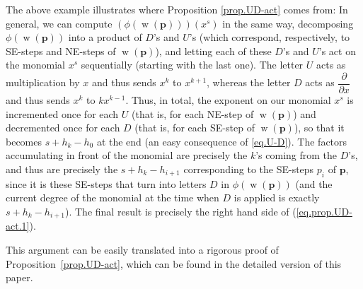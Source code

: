 \documentclass[numbers=enddot,12pt,final,onecolumn,notitlepage]{scrartcl}%
\theoremstyle{definition}
\newcommand{\pp}{\mathbf{p}}
\newcommand{\w}{\operatorname{w}}
\newcommand{\tup}[1]{\left( #1 \right)}
\newenvironment{vershort}{}{}
\begin{document}
The above example illustrates where Proposition \ref{prop.UD-act} comes from:
In general, we can compute $\left(  \phi\left(  \w\left(
\pp\right)  \right)  \right)  \left(  x^{s}\right)  $ in the same way,
decomposing $\phi\left(  \w\left(  \pp\right)  \right)
$ into a product of $D$'s and $U$'s (which correspond, respectively, to
SE-steps and NE-steps of $\w\left(  \pp\right)  $), and
letting each of these $D$'s and $U$'s act on the monomial $x^{s}$ sequentially
(starting with the last one). The letter $U$ acts as multiplication by $x$ and
thus sends $x^{k}$ to $x^{k+1}$, whereas the letter $D$ acts as $\dfrac
{\partial}{\partial x}$ and thus sends $x^{k}$ to $kx^{k-1}$. Thus, in total,
the exponent on our monomial $x^{s}$ is incremented once for each $U$ (that
is, for each NE-step of $\w\left(  \pp\right)  $) and
decremented once for each $D$ (that is, for each SE-step of $\w\left(  \pp\right)  $), so that it
becomes $s+h_{k}-h_{0}$ at the end (an easy consequence of \eqref{eq.U-D}).
The factors accumulating in front of the monomial are precisely the $k$'s
coming from the $D$'s, and thus are precisely the $s+h_{k}-h_{i+1}$
corresponding to the SE-steps $p_{i}$ of $\pp$, since it is these
SE-steps that turn into letters $D$ in $\phi\left(  \w\tup{\pp}\right)  $ (and the
current degree of the monomial at the time when $D$ is applied is exactly
$s+h_{k}-h_{i+1}$). The final result is precisely the right hand side of
(\ref{eq.prop.UD-act.1}).

\begin{vershort}
This argument can be easily translated into a rigorous proof of Proposition~\ref{prop.UD-act}, which can be found in the detailed version of this paper.
\end{vershort}
\end{document}
